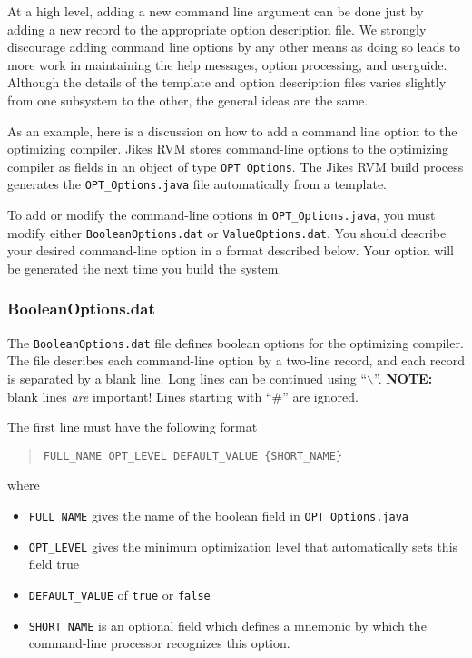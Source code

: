 At a high level, adding a new command line argument can be done just
by adding a new record to the appropriate option description file.  We
strongly discourage adding command line options by any other means as
doing so leads to more work in maintaining the help messages, option
processing, and userguide. Although the details of the template and
option description files varies slightly from one subsystem to the
other, the general ideas are the same.  

As an example, here is a discussion on how to add a command line
option to the optimizing compiler.
Jikes RVM stores command-line options to the optimizing compiler 
as fields in an object of type {\tt OPT\_Options}.
The Jikes RVM build process generates the {\tt OPT\_Options.java} 
file automatically from a template.  

To add or modify the command-line options in {\tt OPT\_Options.java},
you must modify either {\tt BooleanOptions.dat} or 
{\tt ValueOptions.dat}.  You should describe your desired
command-line option in a format described below.
Your option will be generated the next time you build the
system.

\subsubsection{BooleanOptions.dat}

The {\tt BooleanOptions.dat} file defines boolean options for
the optimizing compiler.  The file describes each command-line option 
by a two-line record, and each record is separated
by a blank line.  Long lines can be continued using ``$\backslash$''.
{\bf NOTE:} blank lines {\em are} important!
Lines starting with ``\#'' are ignored.

The first line must have the following format
\begin{quote}
\begin{verbatim}
FULL_NAME OPT_LEVEL DEFAULT_VALUE {SHORT_NAME}
\end{verbatim}
\end{quote}
where
\begin{itemize}
\item {\tt FULL\_NAME} gives the name of the boolean field in {\tt OPT\_Options.java}
\item {\tt OPT\_LEVEL} gives the minimum optimization level that automatically sets this field true
\item {\tt DEFAULT\_VALUE} of {\tt true} or {\tt false}
\item {\tt SHORT\_NAME} is an optional field which defines a mnemonic by which the command-line processor recognizes this option.
\end{itemize}


